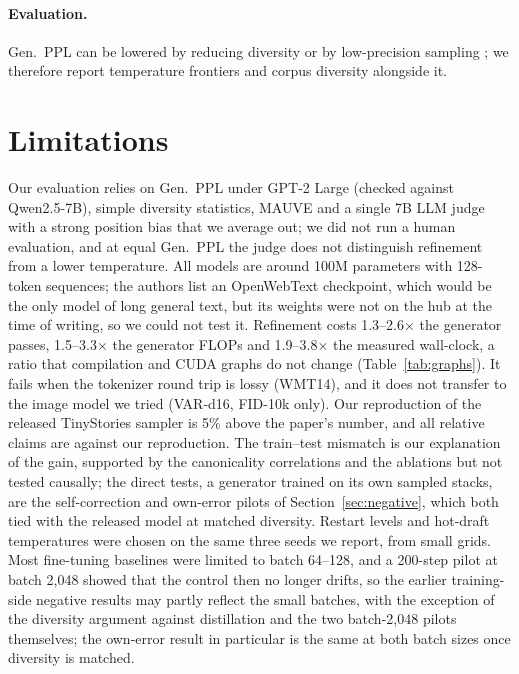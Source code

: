 \documentclass[10pt]{article}
\begin{document}
\paragraph{Evaluation.} Gen.\ PPL can be lowered by reducing diversity or by low-precision sampling \citep{zheng2024maskedsecret,pynadath2026frontiers,franca2026hacking}; we therefore report temperature frontiers and corpus diversity alongside it.

\section{Limitations}

Our evaluation relies on Gen.\ PPL under GPT-2 Large (checked against Qwen2.5-7B), simple diversity statistics, MAUVE and a single 7B LLM judge with a strong position bias that we average out; we did not run a human evaluation, and at equal Gen.\ PPL the judge does not distinguish refinement from a lower temperature. All models are around 100M parameters with 128-token sequences; the authors list an OpenWebText checkpoint, which would be the only model of long general text, but its weights were not on the hub at the time of writing, so we could not test it. Refinement costs 1.3--2.6$\times$ the generator passes, 1.5--3.3$\times$ the generator FLOPs and 1.9--3.8$\times$ the measured wall-clock, a ratio that compilation and CUDA graphs do not change (Table~\ref{tab:graphs}). It fails when the tokenizer round trip is lossy (WMT14), and it does not transfer to the image model we tried (VAR-d16, FID-10k only). Our reproduction of the released TinyStories sampler is 5\% above the paper's number, and all relative claims are against our reproduction. The train--test mismatch is our explanation of the gain, supported by the canonicality correlations and the ablations but not tested causally; the direct tests, a generator trained on its own sampled stacks, are the self-correction and own-error pilots of Section~\ref{sec:negative}, which both tied with the released model at matched diversity. Restart levels and hot-draft temperatures were chosen on the same three seeds we report, from small grids. Most fine-tuning baselines were limited to batch 64--128, and a 200-step pilot at batch 2{,}048 showed that the control then no longer drifts, so the earlier training-side negative results may partly reflect the small batches, with the exception of the diversity argument against distillation and the two batch-2{,}048 pilots themselves; the own-error result in particular is the same at both batch sizes once diversity is matched.
\end{document}
